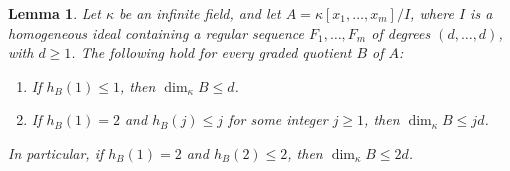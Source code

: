 \documentclass[11pt]{amsart}
\newtheorem{lemma}[theorem]{Lemma}
\theoremstyle{definition}
\newcommand{\dimk}{\dim_{\kappa}}
\begin{document}
\begin{lemma}\label{lem: artinian ring intersection bound}
Let $\kappa$ be an infinite field, and let
$A=\kappa[x_1,\ldots,x_m]/I$, where $I$ is a homogeneous ideal containing a regular sequence
$F_1,\ldots,F_m$ of degrees $(d,\ldots,d)$, with $d\geq 1$.
The following hold for every graded quotient $B$ of $A$:
\begin{enumerate}
    \item If $h_B(1)\leq 1$, then $\dim_\kappa B\leq d$.
    \item If $h_B(1)=2$ and $h_B(j)\leq j$ for some integer
    $j\geq 1$, then $\dim_\kappa B\leq jd$.
\end{enumerate}
In particular, if $h_B(1)=2$ and $h_B(2)\leq 2$, then
$\dimk B\leq 2d$.
\end{lemma}
\end{document}
